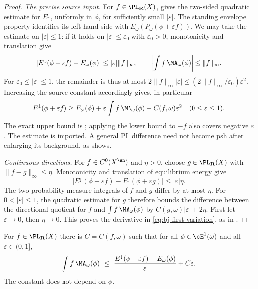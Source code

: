 \begin{proof}
\emph{The precise source input.}
For $f\in\PL_{\mathbf R}(X)$, \cite[Theorem~8.5]{BJ22} gives the
two-sided quadratic estimate for $E^\downarrow$, uniformly in $\phi$,
for sufficiently small $|\varepsilon|$. The standing envelope
property identifies its left-hand side with
$E_\omega(P_\omega(\phi+\varepsilon f))$.
We may take the estimate on $|\varepsilon|\le1$: if it holds on
$|\varepsilon|\le\varepsilon_0$ with $\varepsilon_0>0$, monotonicity
and translation give
\[
 |E^\downarrow(\phi+\varepsilon f)-E_\omega(\phi)|
 \le|\varepsilon|\|f\|_\infty,\qquad
 \left|\int f\,\MA_\omega(\phi)\right|\le\|f\|_\infty .
\]
For $\varepsilon_0\le|\varepsilon|\le1$, the remainder is thus at most
$2\|f\|_\infty|\varepsilon|
\le(2\|f\|_\infty/\varepsilon_0)\varepsilon^2$.
Increasing the source constant accordingly gives, in particular,
\[
 E^\downarrow(\phi+\varepsilon f)\ge
 E_\omega(\phi)+\varepsilon\int f\,\MA_\omega(\phi)
       -C(f,\omega)\varepsilon^2
 \quad(0\le\varepsilon\le1).
\]
The exact upper bound is ;
applying the lower bound to $-f$ also covers negative $\varepsilon$.
The estimate is imported. A general PL difference need not become
psh after enlarging its background, as
 shows.

\emph{Continuous directions.}
For $f\in C^0(X^{\An})$ and $\eta>0$, choose
$g\in\PL_{\mathbf R}(X)$ with $\|f-g\|_\infty\le\eta$.
Monotonicity and translation of equilibrium energy give
\[
 |E^\downarrow(\phi+\varepsilon f)
       -E^\downarrow(\phi+\varepsilon g)|\le|\varepsilon|\eta.
\]
The two probability-measure integrals of $f$ and $g$ differ by at
most $\eta$. For $0<|\varepsilon|\le1$, the quadratic estimate for
$g$ therefore bounds the difference between the directional quotient
for $f$ and $\int f\,\MA_\omega(\phi)$ by
$C(g,\omega)|\varepsilon|+2\eta$.
First let $\varepsilon\to0$, then $\eta\to0$.
This proves the derivative in \eqref{eq:bj-first-variation}, as in
\cite[Corollary~8.6]{BJ22}.
\end{proof}

\begin{corollary}
\label{cor:ch47-uniformity}
For $f\in\PL_{\mathbf R}(X)$ there is $C=C(f,\omega)$ such that for all
$\phi\in\cE^1(\omega)$ and all $\varepsilon\in(0,1]$,
\[
 \int f\,\MA_\omega(\phi)\ \le\
 \frac{E^\downarrow(\phi+\varepsilon f)-E_\omega(\phi)}{\varepsilon}
 +C\varepsilon .
\]
The constant does not depend on $\phi$.
\end{corollary}

